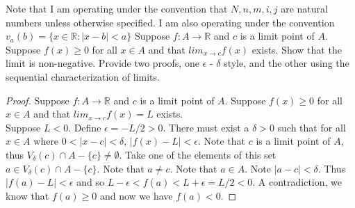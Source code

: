 \documentclass[12pt]{article}
\makeatletter
\theoremstyle{homework}
\newenvironment{exercise}[1]
{\def\@currentlabel{#1}\exercisecore}
{\endexercisecore}
\makeatother
\begin{document}
Note that I am operating under the convention that $N,n,m,i,j$ are natural numbers unless otherwise specified.  I am also operating under the convention $v_a(b)=\{x\in\mathbb{R}:|x-b|<a\}$
\begin{exercise}
1
Suppose $f : A \rightarrow \mathbb{R}$ and $c$ is a limit point of $A$. Suppose $f (x) \geq 0$ for all $x \in A$ and that
$lim_{x \rightarrow c}f (x)$ exists. Show that the limit is non-negative. Provide two proofs, one $\epsilon$ - $\delta$
style, and the other using the sequential characterization of limits.
\end{exercise}
\begin{proof}
Suppose $f : A \rightarrow \mathbb{R}$ and $c$ is a limit point of $A$. Suppose $f (x) \geq 0$ for all $x \in A$ and that
$lim_{x \rightarrow c}f (x)=L$ exists.\\
Suppose $L<0$.  Define $\epsilon=-L/2>0$.  There must exist a $\delta>0$ such that for all $x\in A$ where $0<|x-c|<\delta$, $|f(x)-L|<\epsilon$.  Note that $c$ is a limit point of $A$, thus $V_\delta(c)\cap A-\{c\}\neq \emptyset$.  Take one of the elements of this set $a\in V_\delta(c)\cap A-\{c\}$.  Note that $a\neq c$.  Note that $a\in A$.  Note $|a-c|<\delta$.  Thus $|f(a)-L|<\epsilon$ and so $L-\epsilon<f(a)<L+\epsilon=L/2<0$.  A contradiction, we know that $f(a)\geq 0$ and now we have $f(a)<0$.
\end{proof}
\end{document}
